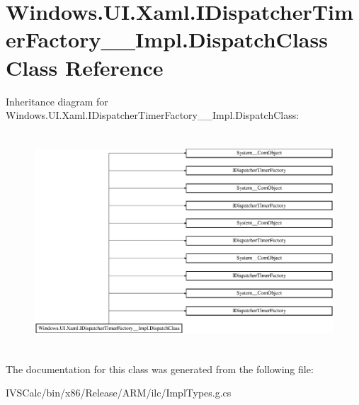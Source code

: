 \hypertarget{class_windows_1_1_u_i_1_1_xaml_1_1_i_dispatcher_timer_factory_____impl_1_1_dispatch_class}{}\section{Windows.\+U\+I.\+Xaml.\+I\+Dispatcher\+Timer\+Factory\+\_\+\+\_\+\+Impl.\+Dispatch\+Class Class Reference}
\label{class_windows_1_1_u_i_1_1_xaml_1_1_i_dispatcher_timer_factory_____impl_1_1_dispatch_class}
Inheritance diagram for Windows.\+U\+I.\+Xaml.\+I\+Dispatcher\+Timer\+Factory\+\_\+\+\_\+\+Impl.\+Dispatch\+Class\+:\begin{figure}[H]
\begin{center}
\leavevmode
\includegraphics[height=8.105263cm]{class_windows_1_1_u_i_1_1_xaml_1_1_i_dispatcher_timer_factory_____impl_1_1_dispatch_class}
\end{center}
\end{figure}


The documentation for this class was generated from the following file\+:\begin{DoxyCompactItemize}
\item 
I\+V\+S\+Calc/bin/x86/\+Release/\+A\+R\+M/ilc/Impl\+Types.\+g.\+cs\end{DoxyCompactItemize}
